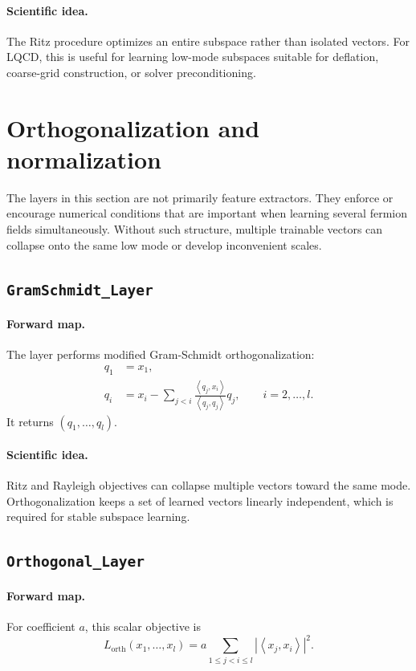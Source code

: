 \documentclass[11pt]{article}
\newcommand{\inner}[2]{\left\langle #1, #2 \right\rangle}
\begin{document}
\paragraph{Scientific idea.}
The Ritz procedure optimizes an entire subspace rather than isolated vectors.
For LQCD, this is useful for learning low-mode subspaces suitable for
deflation, coarse-grid construction, or solver preconditioning.

\section{Orthogonalization and normalization}

The layers in this section are not primarily feature extractors. They enforce
or encourage numerical conditions that are important when learning several
fermion fields simultaneously. Without such structure, multiple trainable
vectors can collapse onto the same low mode or develop inconvenient scales.

\subsection[GramSchmidt Layer]{\texttt{GramSchmidt\_Layer}}

\paragraph{Forward map.}
The layer performs modified Gram-Schmidt orthogonalization:
\begin{align}
  q_1 &= x_1,\\
  q_i &=
  x_i -
  \sum_{j<i}
  \frac{\inner{q_j}{x_i}}{\inner{q_j}{q_j}}q_j,
  \qquad i=2,\dots,l.
\end{align}
It returns $(q_1,\dots,q_l)$.

\paragraph{Scientific idea.}
Ritz and Rayleigh objectives can collapse multiple vectors toward the same
mode. Orthogonalization keeps a set of learned vectors linearly independent,
which is required for stable subspace learning.

\subsection[Orthogonal Layer]{\texttt{Orthogonal\_Layer}}

\paragraph{Forward map.}
For coefficient $a$, this scalar objective is
\[
  L_{\mathrm{orth}}(x_1,\dots,x_l)
  =
  a
  \sum_{1\le j<i\le l}
  \left|\inner{x_j}{x_i}\right|^2.
\]
\end{document}
